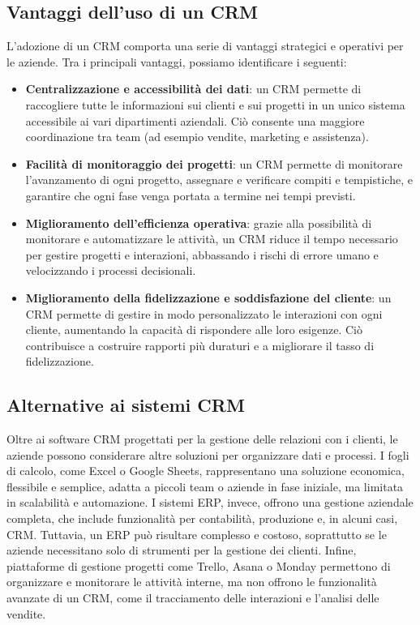 \documentclass[target=bach,aauheader=,style=]{thud}
\begin{document}
\subsection{Vantaggi dell'uso di un CRM}
L'adozione di un CRM comporta una serie di vantaggi strategici e operativi per le aziende. Tra i principali vantaggi, possiamo identificare i seguenti:

\begin{itemize}
   \item \textbf{Centralizzazione e accessibilità dei dati}: un CRM permette di raccogliere tutte le informazioni sui clienti e sui progetti in un unico sistema accessibile ai vari dipartimenti aziendali. Ciò consente una maggiore coordinazione tra team (ad esempio vendite, marketing e assistenza).

   \item \textbf{Facilità di monitoraggio dei progetti}: un CRM permette di monitorare l'avanzamento di ogni progetto, assegnare e verificare compiti e tempistiche, e garantire che ogni fase venga portata a termine nei tempi previsti.

   \item \textbf{Miglioramento dell'efficienza operativa}: grazie alla possibilità di monitorare e automatizzare le attività, un CRM riduce il tempo necessario per gestire progetti e interazioni, abbassando i rischi di errore umano e velocizzando i processi decisionali.

   \item \textbf{Miglioramento della fidelizzazione e soddisfazione del cliente}: un CRM permette di gestire in modo personalizzato le interazioni con ogni cliente, aumentando la capacità di rispondere alle loro esigenze. Ciò contribuisce a costruire rapporti più duraturi e a migliorare il tasso di fidelizzazione.
\end{itemize}

\subsection{Alternative ai sistemi CRM}
Oltre ai software CRM progettati per la gestione delle relazioni con i clienti, le aziende possono considerare altre soluzioni per organizzare dati e processi. I fogli di calcolo, come Excel o Google Sheets, rappresentano una soluzione economica, flessibile e semplice, adatta a piccoli team o aziende in fase iniziale, ma limitata in scalabilità e automazione. I sistemi ERP, invece, offrono una gestione aziendale completa, che include funzionalità per contabilità, produzione e, in alcuni casi, CRM. Tuttavia, un ERP può risultare complesso e costoso, soprattutto se le aziende necessitano solo di strumenti per la gestione dei clienti. Infine, piattaforme di gestione progetti come Trello, Asana o Monday permettono di organizzare e monitorare le attività interne, ma non offrono le funzionalità avanzate di un CRM, come il tracciamento delle interazioni e l'analisi delle vendite.
\end{document}
